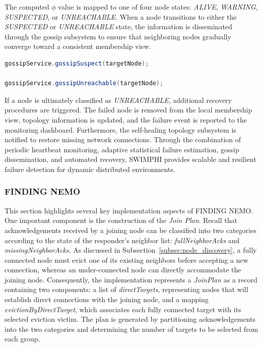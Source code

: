 The computed $\phi$ value is mapped to one of four node states: \textit{ALIVE}, \textit{WARNING}, \textit{SUSPECTED},
or \textit{UNREACHABLE}. When a node transitions to either the \textit{SUSPECTED} or \textit{UNREACHABLE} state, the
information is disseminated through the gossip subsystem to ensure that neighboring nodes gradually converge toward a
consistent membership view.

\begin{lstlisting}[language=Java,
caption={Propagation of failure information},
label={lst:gossip}]
gossipService.gossipSuspect(targetNode);

gossipService.gossipUnreachable(targetNode);
\end{lstlisting}

If a node is ultimately classified as \textit{UNREACHABLE}, additional recovery procedures are triggered. The failed
node is removed from the local membership view, topology information is updated, and the failure event is reported to
the monitoring dashboard. Furthermore, the self-healing topology subsystem is notified to restore missing network
connections. Through the combination of periodic heartbeat monitoring, adaptive statistical failure estimation, gossip
dissemination, and automated recovery, SWIMPHI provides scalable and resilient failure detection for dynamic
distributed environments.

\subsubsection{FINDING NEMO}
\label{subsubsec:node_discovery_code}

This section highlights several key implementation aspects of FINDING NEMO. One important component is the construction
of the \textit{Join Plan}. Recall that acknowledgements received by a joining node can be classified into two
categories according to the state of the responder's neighbor list: \textit{fullNeighborAcks} and
\textit{missingNeighborAcks}. As discussed in Subsection~\ref{subsec:node_discovery}, a fully connected node must evict
one of its existing neighbors before accepting a new connection, whereas an under-connected node can directly
accommodate the joining node. Consequently, the implementation represents a \textit{JoinPlan} as a record containing
two components: a list of \textit{directTargets}, representing nodes that will establish direct connections with the
joining node, and a mapping \textit{evictionByDirectTarget}, which associates each fully connected target with its
selected eviction victim. The plan is generated by partitioning acknowledgements into the two categories and
determining the number of targets to be selected from each group.

